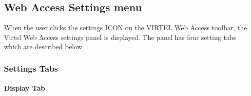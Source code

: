 \documentclass[letterpaper,10pt,english]{sphinxmanual}
\begin{document}
\subsection{Web Access Settings menu}
\label{\detokenize{User_Guide:v457ug-settings-menu}}\label{\detokenize{User_Guide:web-access-settings-menu}}
 When the user clicks the settings ICON on the VIRTEL Web Access toolbar, the Virtel Web Access settings panel is displayed. The panel has four setting tabs which are described below.


\subsubsection{Settings Tabs}
\label{\detokenize{User_Guide:settings-tabs}}

\paragraph{Display Tab}
\label{\detokenize{User_Guide:display-tab}}
\end{document}
